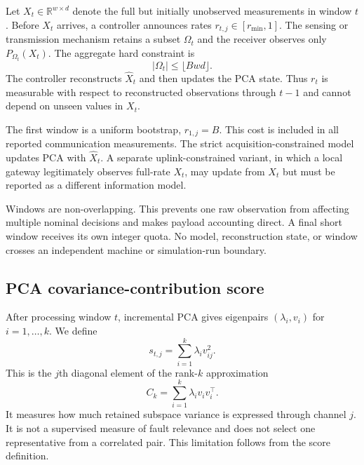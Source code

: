 \documentclass[pdflatex,sn-vancouver-num]{sn-jnl}
\theoremstyle{thmstyleone}
\begin{document}
Let $X_t\in\mathbb{R}^{w\times d}$ denote the full but initially unobserved
measurements in window $t$. Before $X_t$ arrives, a controller announces rates
$r_{t,j}\in[r_{\min},1]$. The sensing or transmission mechanism retains a
subset $\Omega_t$ and the receiver observes only
$P_{\Omega_t}(X_t)$. The aggregate hard constraint is
\begin{equation}
 |\Omega_t|\leq \lfloor Bwd\rfloor .
\label{eq:hardbudget}
\end{equation}
The controller reconstructs $\widehat X_t$ and then updates the PCA state.
Thus $r_t$ is measurable with respect to reconstructed observations through
$t-1$ and cannot depend on unseen values in $X_t$.

The first window is a uniform bootstrap, $r_{1,j}=B$. This cost is included in
all reported communication measurements. The strict acquisition-constrained
model updates PCA with $\widehat X_t$. A separate uplink-constrained variant,
in which a local gateway legitimately observes full-rate $X_t$, may update from
$X_t$ but must be reported as a different information model.

Windows are non-overlapping. This prevents one raw observation from affecting
multiple nominal decisions and makes payload accounting direct. A final short
window receives its own integer quota. No model, reconstruction state, or
window crosses an independent machine or simulation-run boundary.

\subsection{PCA covariance-contribution score}

After processing window $t$, incremental PCA gives eigenpairs
$(\lambda_i,v_i)$ for $i=1,\ldots,k$. We define
\begin{equation}
 s_{t,j}=\sum_{i=1}^{k}\lambda_i v_{ij}^{2}.
\label{eq:score}
\end{equation}
This is the $j$th diagonal element of the rank-$k$ approximation
\begin{equation}
 C_k=\sum_{i=1}^k\lambda_i v_iv_i^\top.
\end{equation}
It measures how much retained
subspace variance is expressed through channel $j$. It is not a supervised
measure of fault relevance and does not select one representative from a
correlated pair. This limitation follows from the score definition.
\end{document}
